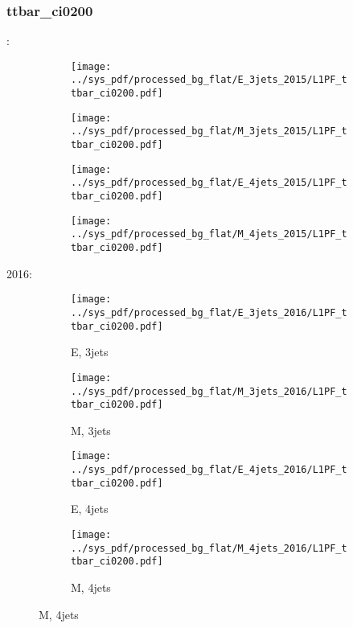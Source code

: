\documentclass{beamer}
\begin{document}
\begin{frame}
\frametitle{ttbar_ci0200}
\fontsize{5}{1}:
\begin{figure}
\centering
\begin{subfigure}[b]{0.24\textwidth}
\texttt{[image: ../sys\_pdf/processed\_bg\_flat/E\_3jets\_2015/L1PF\_ttbar\_ci0200.pdf]}
\end{subfigure}
\begin{subfigure}[b]{0.24\textwidth}
\texttt{[image: ../sys\_pdf/processed\_bg\_flat/M\_3jets\_2015/L1PF\_ttbar\_ci0200.pdf]}
\end{subfigure}
\begin{subfigure}[b]{0.24\textwidth}
\texttt{[image: ../sys\_pdf/processed\_bg\_flat/E\_4jets\_2015/L1PF\_ttbar\_ci0200.pdf]}
\end{subfigure}
\begin{subfigure}[b]{0.24\textwidth}
\texttt{[image: ../sys\_pdf/processed\_bg\_flat/M\_4jets\_2015/L1PF\_ttbar\_ci0200.pdf]}
\end{subfigure}
\end{figure}
2016:
\begin{figure}
\centering
\begin{subfigure}[b]{0.24\textwidth}
\texttt{[image: ../sys\_pdf/processed\_bg\_flat/E\_3jets\_2016/L1PF\_ttbar\_ci0200.pdf]}
\captionsetup{font=tiny}
\caption{E, 3jets}
\end{subfigure}
\begin{subfigure}[b]{0.24\textwidth}
\texttt{[image: ../sys\_pdf/processed\_bg\_flat/M\_3jets\_2016/L1PF\_ttbar\_ci0200.pdf]}
\captionsetup{font=tiny}
\caption{M, 3jets}
\end{subfigure}
\begin{subfigure}[b]{0.24\textwidth}
\texttt{[image: ../sys\_pdf/processed\_bg\_flat/E\_4jets\_2016/L1PF\_ttbar\_ci0200.pdf]}
\captionsetup{font=tiny}
\caption{E, 4jets}
\end{subfigure}
\begin{subfigure}[b]{0.24\textwidth}
\texttt{[image: ../sys\_pdf/processed\_bg\_flat/M\_4jets\_2016/L1PF\_ttbar\_ci0200.pdf]}
\captionsetup{font=tiny}
\caption{M, 4jets}
\end{subfigure}
\end{figure}
\end{frame}
\end{document}
